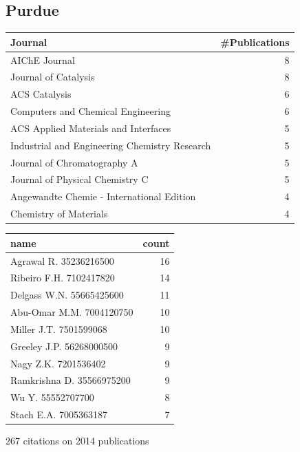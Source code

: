 \documentclass[11pt]{article}
\begin{document}
\subsection{Purdue}
\label{sec-1-11}
\begin{center}
\begin{tabular}{lr}
Journal & \#Publications\\
\hline
AIChE Journal & 8\\
Journal of Catalysis & 8\\
ACS Catalysis & 6\\
Computers and Chemical Engineering & 6\\
ACS Applied Materials and Interfaces & 5\\
Industrial and Engineering Chemistry Research & 5\\
Journal of Chromatography A & 5\\
Journal of Physical Chemistry C & 5\\
Angewandte Chemie - International Edition & 4\\
Chemistry of Materials & 4\\
\end{tabular}
\end{center}

\begin{center}
\begin{tabular}{lr}
name & count\\
\hline
Agrawal R. 35236216500 & 16\\
Ribeiro F.H. 7102417820 & 14\\
Delgass W.N. 55665425600 & 11\\
Abu-Omar M.M. 7004120750 & 10\\
Miller J.T. 7501599068 & 10\\
Greeley J.P. 56268000500 & 9\\
Nagy Z.K. 7201536402 & 9\\
Ramkrishna D. 35566975200 & 9\\
Wu Y. 55552707700 & 8\\
Stach E.A. 7005363187 & 7\\
\end{tabular}
\end{center}

267 citations on 2014 publications
\end{document}
